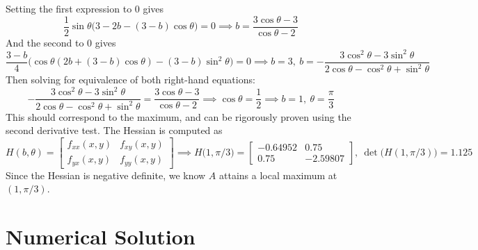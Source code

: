 \documentclass{article}
\begin{document}
Setting the first expression to 0 gives
$$ \frac{1}{2} \sin \theta \big(3 - 2b - (3-b)\cos \theta) = 0 \implies b = \frac{3 \cos \theta  - 3}{\cos \theta - 2}$$
And the second to 0 gives 
$$  \frac{3-b}{4} \big (\cos \theta (2b + (3-b)\cos \theta ) - (3-b) \sin^2 \theta \big) =0  \implies b = 3, \ b = -\frac{3\cos^2 \theta - 3 \sin^2 \theta}{2 \cos \theta 	- \cos^2 \theta + \sin ^2 \theta}$$
Then solving for equivalence of both right-hand equations:
$$ -\frac{3\cos^2 \theta - 3 \sin^2 \theta}{2 \cos \theta 	- \cos^2 \theta + \sin ^2 \theta} = \frac{3 \cos \theta  - 3}{\cos \theta - 2} \implies \cos \theta = \frac{1}{2} \implies b = 1,  \ \theta = \frac{\pi}{3} $$
This should correspond to the maximum, and can be rigorously proven using the second derivative test. The Hessian is computed as
$$ H(b,\theta) = \begin{bmatrix} f_{xx}(x,y) & f_{xy}(x,y)\\ f_{yx}(x,y) & f_{yy}(x,y) \end{bmatrix} \implies H \big( 1, \pi/3 \big) = \begin{bmatrix} -0.64952 & 0.75 \\ 0.75 & -2.59807 \end{bmatrix}, \ \det \big( H(1, \pi/3) \big)=1.125$$ 
Since the Hessian is negative definite, we know $A$ attains a local maximum at $(1, \pi/3)$. 
 
 \newpage

\section*{Numerical Solution}
\end{document}
